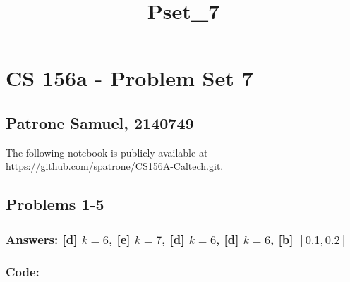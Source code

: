 \documentclass[11pt]{article}
\title{Pset\_7}
\begin{document}
    
    \maketitle
    
    

    
    \hypertarget{cs-156a---problem-set-7}{%
\section{CS 156a - Problem Set 7}\label{cs-156a---problem-set-7}}

\hypertarget{patrone-samuel-2140749}{%
\subsection{Patrone Samuel, 2140749}\label{patrone-samuel-2140749}}

The following notebook is publicly available at
https://github.com/spatrone/CS156A-Caltech.git.

    \hypertarget{problems-1-5}{%
\subsection{Problems 1-5}\label{problems-1-5}}

\hypertarget{answers-d-k6-e-k7-d-k6-d-k6-b-0.10.2}{%
\subsubsection{\texorpdfstring{Answers: {[}d{]} \(k=6\), {[}e{]}
\(k=7\), {[}d{]} \(k=6\), {[}d{]} \(k=6\), {[}b{]}
\([0.1,0.2]\)}{Answers: {[}d{]} k=6, {[}e{]} k=7, {[}d{]} k=6, {[}d{]} k=6, {[}b{]} {[}0.1,0.2{]}}}\label{answers-d-k6-e-k7-d-k6-d-k6-b-0.10.2}}

\hypertarget{code}{%
\subsubsection{Code:}\label{code}}
\end{document}
